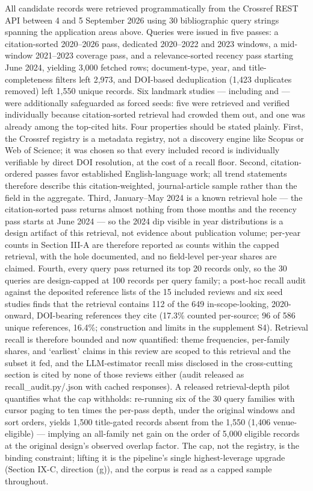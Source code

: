 \documentclass[journal]{IEEEtran}
\begin{document}
All candidate records were retrieved programmatically from the Crossref REST API between 4 and 5 September 2026 using 30 bibliographic query strings spanning the application areas above. Queries were issued in five passes: a citation-sorted 2020--2026 pass, dedicated 2020--2022 and 2023 windows, a mid-window 2021--2023 coverage pass, and a relevance-sorted recency pass starting June 2024, yielding 3,000 fetched rows; document-type, year, and title-completeness filters left 2,973, and DOI-based deduplication (1,423 duplicates removed) left 1,550 unique records. Six landmark studies --- including \cite{r3} and \cite{r2} --- were additionally safeguarded as forced seeds: five were retrieved and verified individually because citation-sorted retrieval had crowded them out, and one was already among the top-cited hits. Four properties should be stated plainly. First, the Crossref registry is a metadata registry, not a discovery engine like Scopus or Web of Science; it was chosen so that every included record is individually verifiable by direct DOI resolution, at the cost of a recall floor. Second, citation-ordered passes favor established English-language work; all trend statements therefore describe this citation-weighted, journal-article sample rather than the field in the aggregate. Third, January--May 2024 is a known retrieval hole --- the citation-sorted pass returns almost nothing from those months and the recency pass starts at June 2024 --- so the 2024 dip visible in year distributions is a design artifact of this retrieval, not evidence about publication volume; per-year counts in Section III-A are therefore reported as counts within the capped retrieval, with the hole documented, and no field-level per-year shares are claimed. Fourth, every query pass returned its top 20 records only, so the 30 queries are design-capped at 100 records per query family; a post-hoc recall audit against the deposited reference lists of the 15 included reviews and six seed studies finds that the retrieval contains 112 of the 649 in-scope-looking, 2020-onward, DOI-bearing references they cite (17.3\% counted per-source; 96 of 586 unique references, 16.4\%; construction and limits in the supplement S4). Retrieval recall is therefore bounded and now quantified: theme frequencies, per-family shares, and `earliest' claims in this review are scoped to this retrieval and the subset it fed, and the LLM-estimator recall miss disclosed in the cross-cutting section is cited by none of those reviews either (audit released as recall\_audit.py/.json with cached responses). A released retrieval-depth pilot quantifies what the cap withholds: re-running six of the 30 query families with cursor paging to ten times the per-pass depth, under the original windows and sort orders, yields 1,500 title-gated records absent from the 1,550 (1,406 venue-eligible) --- implying an all-family net gain on the order of 5,000 eligible records at the original design's observed overlap factor. The cap, not the registry, is the binding constraint; lifting it is the pipeline's single highest-leverage upgrade (Section IX-C, direction (g)), and the corpus is read as a capped sample throughout.
\end{document}
